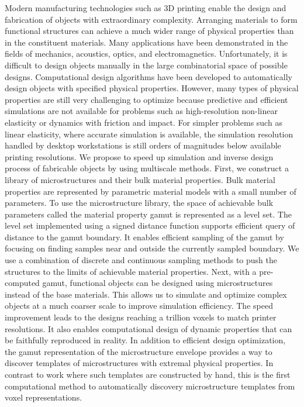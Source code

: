 % 
%
Modern manufacturing technologies such as 3D printing enable the design and fabrication of objects with extraordinary complexity.
Arranging materials to form functional structures can achieve a much wider range of physical properties than in the constituent materials.
Many applications have been demonstrated in the fields of mechanics, acoustics, optics, and electromagnetics.
Unfortunately, it is difficult to design objects manually in the large combinatorial space of possible designs.
Computational design algorithms have been developed to automatically design objects with specified physical properties.
However, many types of physical properties are still very challenging to optimize because predictive and efficient simulations are not available for 
problems such as high-resolution non-linear elasticity or dynamics with friction and impact.
For simpler problems such as linear elasticity, where accurate simulation is available,
the simulation resolution handled by desktop workstations is still orders of magnitudes below available printing resolutions.
We propose to speed up simulation and inverse design process of fabricable objects by using multiscale methods.
First, we construct a library of microstructures and their bulk material properties.
Bulk material properties are represented by parametric material models with a small number of parameters.
To use the microstructure library, the space of achievable bulk parameters called the material property gamut is represented as a level set.
The level set implemented using a signed distance function supports efficient query of distance to the gamut boundary. It enables efficient sampling of the gamut by focusing on finding samples near and outside the currently sampled boundary. We use a combination of discrete and continuous sampling methods to push the structures to the limits of achievable material properties.
Next, with a pre-computed gamut, functional objects can be designed using microstructures instead of the base materials.
This allows us to simulate and optimize complex objects at a much coarser scale to improve simulation efficiency. The speed improvement leads to the designs reaching a trillion voxels to match printer resolutions. It also enables computational design of dynamic properties that can be faithfully reproduced in reality.
In addition to efficient design optimization, 
the gamut representation of the microstructure envelope provides a way to discover templates of microstructures with extremal physical properties.
In contrast to work where such templates are constructed by hand,
this is the first computational method to automatically discovery microstructure templates from voxel representations.

